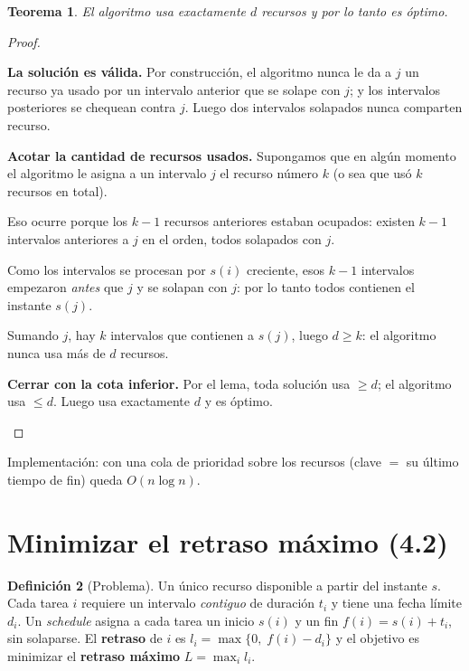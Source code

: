 \documentclass[11pt,a4paper]{article}
\theoremstyle{plain}
\newtheorem{teorema}{Teorema}[section]
\theoremstyle{definition}
\newtheorem{definicion}[teorema]{Definición}
\theoremstyle{remark}
\begin{document}
\begin{teorema}
El algoritmo usa exactamente $d$ recursos y por lo tanto es óptimo.
\end{teorema}
\begin{proof}
\begin{pasos}
\item \textbf{La solución es válida.} Por construcción, el algoritmo nunca le da a $j$
un recurso ya usado por un intervalo anterior que se solape con $j$; y los intervalos
posteriores se chequean contra $j$. Luego dos intervalos solapados nunca comparten
recurso.
\item \textbf{Acotar la cantidad de recursos usados.} Supongamos que en algún momento el
algoritmo le asigna a un intervalo $j$ el recurso número $k$ (o sea que usó $k$
recursos en total).
\item Eso ocurre porque los $k-1$ recursos anteriores estaban ocupados: existen $k-1$
intervalos anteriores a $j$ en el orden, todos solapados con $j$.
\item Como los intervalos se procesan por $s(i)$ creciente, esos $k-1$ intervalos
empezaron \emph{antes} que $j$ y se solapan con $j$: por lo tanto todos contienen el
instante $s(j)$.
\item Sumando $j$, hay $k$ intervalos que contienen a $s(j)$, luego $d\ge k$: el
algoritmo nunca usa más de $d$ recursos.
\item \textbf{Cerrar con la cota inferior.} Por el lema, toda solución usa $\ge d$; el
algoritmo usa $\le d$. Luego usa exactamente $d$ y es óptimo. \qedhere
\end{pasos}
\end{proof}

\noindent Implementación: con una cola de prioridad sobre los recursos (clave $=$ su
último tiempo de fin) queda $O(n\log n)$.

\section{Minimizar el retraso máximo (4.2)}

\begin{definicion}[Problema]
Un único recurso disponible a partir del instante $s$. Cada tarea $i$ requiere un
intervalo \emph{contiguo} de duración $t_i$ y tiene una fecha límite $d_i$. Un
\emph{schedule} asigna a cada tarea un inicio $s(i)$ y un fin $f(i)=s(i)+t_i$, sin
solaparse. El \textbf{retraso} de $i$ es $l_i=\max\{0,\;f(i)-d_i\}$ y el objetivo es
minimizar el \textbf{retraso máximo} $L=\max_i l_i$.
\end{definicion}
\end{document}
